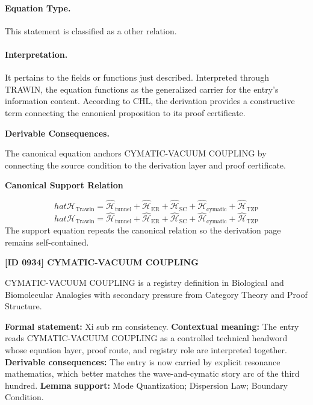 \paragraph{Equation Type.}
This statement is classified as a other relation.

\paragraph{Interpretation.}
It pertains to the fields or functions just described. Interpreted through TRAWIN, the equation functions as the generalized carrier for the entry’s information content. According to CHL, the derivation provides a constructive term connecting the canonical proposition to its proof certificate.

\par\vspace{0.35em}
\noindent\textbf{Derivable Consequences.}\quad
\begingroup
\footnotesize
\raggedright
The canonical equation anchors CYMATIC-VACUUM COUPLING by connecting the source condition to the derivation layer and proof certificate.
\par\endgroup

\noindent\textbf{Canonical Support Relation}\par
\[
hat{\mathcal{H}}_{\text{Trawin}} = \hat{\mathcal{H}}_{\text{tunnel}} + \hat{\mathcal{H}}_{\text{ER}} + \hat{\mathcal{H}}_{\text{SC}} + \hat{\mathcal{H}}_{\text{cymatic}} + \hat{\mathcal{H}}_{\text{TZP}}
\]
\[
hat{\mathcal{H}}_{\text{Trawin}} = \hat{\mathcal{H}}_{\text{tunnel}} + \hat{\mathcal{H}}_{\text{ER}} + \hat{\mathcal{H}}_{\text{SC}} + \hat{\mathcal{H}}_{\text{cymatic}} + \hat{\mathcal{H}}_{\text{TZP}}
\]
\noindent The support equation repeats the canonical relation so the derivation page remains self-contained.\par

\clearpage
\noindent\textbf{[ID 0934] CYMATIC-VACUUM COUPLING}\par
\vspace{0.35em}
\begingroup\small
{}
CYMATIC-VACUUM COUPLING is a registry definition in Biological and Biomolecular Analogies with secondary pressure from Category Theory and Proof Structure.

\begingroup\footnotesize\setlength{\emergencystretch}{3em}\sloppy
\textbf{Formal statement:} Xi sub rm consistency. \textbf{Contextual meaning:} The entry reads CYMATIC-VACUUM COUPLING as a controlled technical headword whose equation layer, proof route, and registry role are interpreted together. \textbf{Derivable consequences:} The entry is now carried by explicit resonance mathematics, which better matches the wave-and-cymatic story arc of the third hundred. \textbf{Lemma support:} Mode Quantization; Dispersion Law; Boundary Condition.\par
\endgroup

